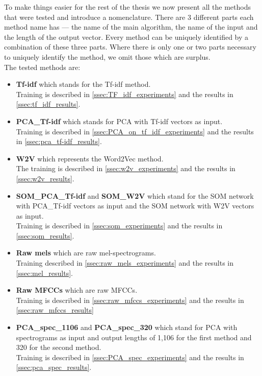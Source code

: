 To make things easier for the rest of the thesis we now present all the methods that were tested and introduce a nomenclature. There are 3 different
parts each method name has --- the name of the main algorithm, the name of the input and the length of the output vector. Every method can be uniquely 
identified by a combination of these three parts. Where there is only one or
two parts necessary to uniquely identify the method, we omit those which are surplus. \\
The tested methods are:
\renewcommand\labelitemii{\textperiodcentered}
\begin{itemize}
     \item \textbf{Tf-idf} which stands for the Tf-idf method. \\
        Training is described in \ref{ssec:TF_idf_experiments} and the results in \ref{ssec:tf_idf_results}.
    \item \textbf{PCA\_Tf-idf} which stands for PCA with Tf-idf vectors as input. \\
    Training is described in \ref{ssec:PCA_on_tf_idf_experiments} and the results in \ref{ssec:pca_tf-idf_results}.
    \item \textbf{W2V} which represents the Word2Vec method. \\
        The training is described in \ref{ssec:w2v_experiments} and the results in \ref{ssec:w2v_results}.
    \item \textbf{SOM\_PCA\_Tf-idf} and \textbf{SOM\_W2V} which stand for the SOM network with PCA\_Tf-idf vectors as input and the SOM network with W2V vectors as input. \\
            Training is described in \ref{ssec:som_experiments} and the results in \ref{ssec:som_results}.
    \item \textbf{Raw mels} which are raw mel-spectrograms. \\
             Training described in \ref{ssec:raw_mels_experiments} and the results in \ref{ssec:mel_results}.
    \item \textbf{Raw MFCCs} which are raw MFCCs. \\
        Training is described in \ref{ssec:raw_mfccs_experiments} and the results in \ref{ssec:raw_mfccs_results}
    \item \textbf{PCA\_spec\_1106} and \textbf{PCA\_spec\_320} which stand for PCA with spectrograms as input and output lengths of 1,106 for the first method and 320 for the second method. \\
        Training is described in \ref{ssec:PCA_spec_experiments} and the results in \ref{ssec:pca_spec_results}.

\end{itemize}
